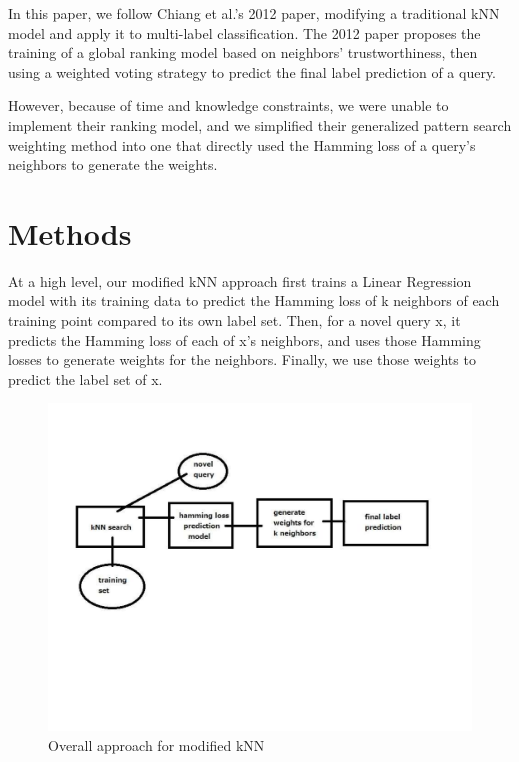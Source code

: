\documentclass{article}
\begin{document}
In this paper, we follow Chiang et al.'s 2012 paper, modifying a traditional kNN model and apply it to multi-label classification. The 2012 paper proposes the training of a global ranking model based on neighbors' trustworthiness, then using a weighted voting strategy to predict the final label prediction of a query. 

However, because of time and knowledge constraints, we were unable to implement their ranking model, and we simplified their generalized pattern search weighting method into one that directly used the Hamming loss of a query's neighbors to generate the weights. 

\section{Methods}
\label{methods}

At a high level, our modified kNN approach first trains a Linear Regression model with its training data to predict the Hamming loss of k neighbors of each training point compared to its own label set. Then, for a novel query x, it predicts the Hamming loss of each of x's neighbors, and uses those Hamming losses to generate weights for the neighbors. Finally, we use those weights to predict the label set of x.

\begin{figure}[ht]
\vskip 0.2in
\begin{center}
\centerline{\includegraphics[width=\columnwidth]{diagram}}
\caption{Overall approach for modified kNN}
\label{icml-historical}
\end{center}
\vskip -0.2in
\end{figure}
\end{document}
